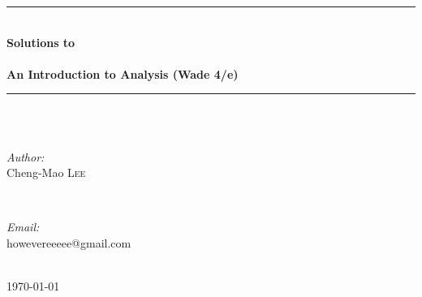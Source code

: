 \begin{titlepage}

\newcommand{\HRule}{\rule{\linewidth}{0.5mm}} %

\center %
 



\HRule \\[0.4cm]
{ \huge \bfseries Solutions to \\
~\\
An Introduction to Analysis (Wade 4/e) }\\[0.4cm] %
\HRule \\[1.5cm]
 

~\\[2cm]
\begin{minipage}{0.4\textwidth}
\begin{flushleft} \large
\emph{Author:}\\
Cheng-Mao \textsc{Lee} %
\end{flushleft}
\end{minipage}
~
\begin{minipage}{0.4\textwidth}
\begin{flushleft} \large
\emph{Email:} \\
howevereeeee@gmail.com %
\end{flushleft}
\end{minipage}\\[6cm]



{\large \today}\\[3cm] %


 

\vfill %

\end{titlepage}